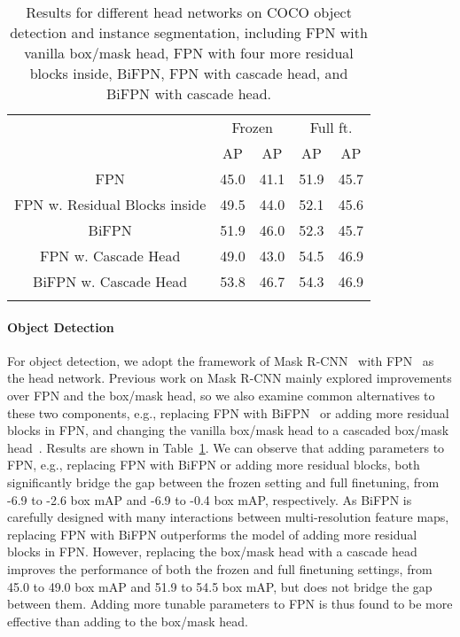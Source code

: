 \documentclass{article}
\begin{document}
\begin{table}[h]
        \centering
\addtolength{\tabcolsep}{3.0pt}
        \begin{tabular}{c|cc|cc}
            \Xhline{1.0pt}
            \multirow{2}{*}{Head Network} & \multicolumn{2}{c|}{Frozen} & \multicolumn{2}{c}{Full ft.} \\
            & AP & AP & AP & AP \\
            \hline
            FPN & 45.0 & 41.1 & 51.9 & 45.7  \\
            FPN w.  Residual Blocks inside & 49.5 & 44.0 & 52.1 & 45.6 \\
            BiFPN & 51.9 & 46.0 & 52.3 & 45.7 \\
            FPN w. Cascade Head & 49.0 & 43.0 & 54.5 & 46.9 \\
            BiFPN w. Cascade Head & 53.8 & 46.7 & 54.3 & 46.9 \\
          \Xhline{1.0pt}  
       \end{tabular}
       \caption{Results for different head networks on COCO object detection and instance segmentation, including FPN with vanilla box/mask head, FPN with four more residual blocks inside, BiFPN, FPN with cascade head, and BiFPN with cascade head.}
    \label{tab:param_at_head_coco}
\end{table}

\paragraph{Object Detection} For object detection, we adopt the framework of Mask R-CNN~\cite{Mask-rcnn} with FPN~\cite{FPN} as the head network. Previous work on Mask R-CNN mainly explored improvements over FPN and the box/mask head, so we also examine common alternatives to these two components, e.g., replacing FPN with BiFPN~\cite{tan2020efficientdet} or adding more residual blocks in FPN, and changing the vanilla box/mask head to a cascaded box/mask head~\cite{cai2018cascade}. Results are shown in Table~\ref{tab:param_at_head_coco}. 
We can observe that adding parameters to FPN, e.g., replacing FPN with BiFPN or adding more residual blocks, both significantly bridge the gap between the frozen setting and full finetuning, from -6.9 to -2.6 box mAP and -6.9 to -0.4 box mAP, respectively. As BiFPN is carefully designed with many interactions between multi-resolution feature maps, replacing FPN with BiFPN outperforms the model of adding more residual blocks in FPN. However, replacing the box/mask head with a cascade head~\cite{cai2018cascade} improves the performance of both the frozen and full finetuning settings, from 45.0 to 49.0 box mAP and 51.9 to 54.5 box mAP, but does not bridge the gap between them. 
Adding more tunable parameters to FPN is thus found to be more effective than adding to the box/mask head.
\end{document}
